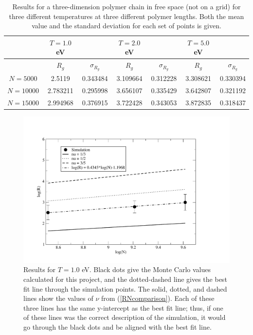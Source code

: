 \documentclass{article}
\begin{document}
\begin{multicols}{2}
\begin{table}
\begin{center}
\begin{tabular}{| c | c | c | c | c | c | c |}
\hline & $T=1.0$ eV &  & $T=2.0$ eV &  & $T=5.0$ eV & \\ \hline
 & \textbf{$R_g$} & \textbf{$\sigma _{R_g}$} & \textbf{$R_g$} & \textbf{$\sigma _{R_g}$} & \textbf{$R_g$} & \textbf{$\sigma _{R_g}$} \\ \hline
$N=5000$ & 2.5119 & 0.343484 & 3.109664 & 0.312228 & 3.308621 & 0.330394 \\ \hline
$N=10000$ & 2.783211 & 0.295998 & 3.656107 & 0.335429 & 3.642807 & 0.321192 \\ \hline
$N=15000$ & 2.994968 & 0.376915 & 3.722428 & 0.343053 & 3.872835 & 0.318437 \\ \hline
\end{tabular}
\label{results}
\caption{Results for a three-dimension polymer chain in free space (not on a grid) for three different temperatures at three different polymer lengths.  Both the mean value and the standard deviation for each set of points is given.}
\end{center}
\end{table}

\begin{figure}[H]
\begin{center}
\includegraphics[width=\linewidth]{Figures/T1plot.pdf}
\caption{Results for $T=1.0$ eV.  Black dots give the Monte Carlo values calculated for this project, and the dotted-dashed line gives the best fit line through the simulation points.  The solid, dotted, and dashed lines show the values of $\nu$ from (\ref{RNcomparison}).  Each of these three lines has the same y-intercept as the best fit line; thus, if one of these lines was the correct description of the simulation, it would go through the black dots and be aligned with the best fit line.}
\label{T1fig}
\end{center}
\end{figure}


\end{multicols}
\end{document}
